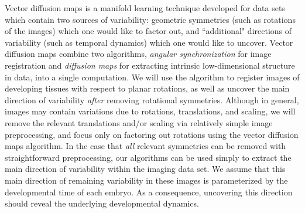 \documentclass[twocolumn, 10pt]{article}
\begin{document}
Vector diffusion maps \citep{singer2012vector} is a manifold learning
technique developed for data sets which contain two sources of variability:
geometric symmetries (such as rotations of the images) which one would like to factor out,
and ``additional" directions of variability (such as temporal dynamics) which one would like to uncover.
%
Vector diffusion maps combine two algorithms, {\em angular synchronization} \citep{singer2011angular} for image registration and {\em diffusion maps} \citep{coifman2005geometric} for extracting intrinsic low-dimensional structure in data, into a single computation.
%
We will use the algorithm to register images of developing tissues with respect to planar rotations, as well as uncover the main direction of variability {\it after} removing rotational symmetries.
%
Although in general, images may contain variations due to rotations, translations, and scaling, we will remove the relevant translations and/or scaling via relatively simple image preprocessing, and focus only on factoring out rotations using the vector diffusion maps algorithm.
%
In the case that {\em all} relevant symmetries can be removed with straightforward preprocessing, our algorithms can be used simply to extract the main direction of variability within the imaging data set.
%
We assume that this main direction of remaining variability in these images is parameterized by the developmental time of each embryo.
%
As a consequence, uncovering this direction should reveal the underlying developmental dynamics.
\end{document}
